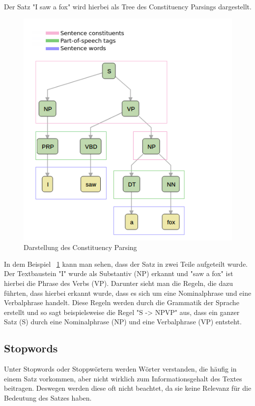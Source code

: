 Der Satz "I saw a fox" wird hierbei als Tree des Constituency Parsings dargestellt.

\begin{figure}[hbt!]
    \centering
    \includegraphics[scale=0.5]{pics/constituency_parse_tree}
    \caption{Darstellung des Constituency Parsing~\cite{dependencyVsConstituencyParsing}}
    \label{fig:constituency_parsing_tree}
\end{figure}

In dem Beispiel ~\ref{fig:constituency_parsing_tree} kann man sehen, dass der Satz in zwei Teile aufgeteilt wurde.
Der Textbaustein "I" wurde als Substantiv (NP) erkannt und "saw a fox" ist hierbei die Phrase des Verbs (VP).
Darunter sieht man die Regeln, die dazu führten, dass hierbei erkannt wurde, dass es sich um eine Nominalphrase und eine Verbalphrase handelt.
Diese Regeln werden durch die Grammatik der Sprache erstellt und so sagt beispielsweise die Regel "S -> NPVP" aus, dass ein ganzer Satz (S) durch eine Nominalphrase (NP) und eine Verbalphrase (VP) entsteht.\cite{dependencyVsConstituencyParsing}

\subsection{Stopwords}

Unter Stopwords oder Stoppwörtern werden Wörter verstanden, die häufig in einem Satz vorkommen, aber nicht wirklich zum Informationsgehalt des Textes beitragen.
Deswegen werden diese oft nicht beachtet, da sie keine Relevanz für die Bedeutung des Satzes haben.

